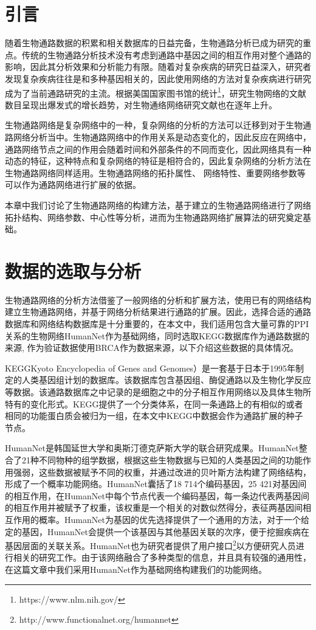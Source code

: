 \section{引言}
随着生物通路数据的积累和相关数据库的日益完备，生物通路分析已成为研究的重点。传统的生物通路分析技术没有考虑到通路中基因之间的相互作用对整个通路的影响，因此其分析效果和分析能力有限。随着对复杂疾病的研究日益深入，研究者发现复杂疾病往往是和多种基因相关的，因此使用网络的方法对复杂疾病进行研究成为了当前通路研究的主流。根据美国国家图书馆的统计\footnote{https://www.nlm.nih.gov/}，研究生物网络的文献数目呈现出爆发式的增长趋势，对生物通络网络研究文献也在逐年上升。

生物通路网络是复杂网络中的一种，复杂网络的分析的方法可以迁移到对于生物通路网络分析当中。生物通路网络中的作用关系是动态变化的，因此反应在网络中，通路网络节点之间的作用会随着时间和外部条件的不同而变化，因此网络具有一种动态的特征，这种特点和复杂网络的特征是相符合的，因此复杂网络的分析方法在生物通路网络同样适用。生物通路网络的拓扑属性、 网络特性、重要网络参数等可以作为通路网络进行扩展的依据。

本章中我们讨论了生物通路网络的构建方法，基于建立的生物通路网络进行了网络拓扑结构、网络参数、中心性等分析，进而为生物通路网络扩展算法的研究奠定基础。

\section{数据的选取与分析}
生物通路网络的分析方法借鉴了一般网络的分析和扩展方法，使用已有的网络结构建立生物通路网络，并基于网络分析结果进行通路的扩展。因此，选择合适的通路数据库和网络结构数据库是十分重要的，在本文中，我们适用包含大量可靠的PPI关系的生物网络HumanNet\cite{lee2011prioritizing}作为基础网络，同时选取KEGG\cite{kanehisa2008kegg}数据库作为通路数据的来源, 作为验证数据使用BRCA作为数据来源，以下介绍这些数据的具体情况。

KEGG\cite{kanehisa2008kegg}Kyoto Encyclopedia of Genes and Genomes）是一套基于日本于1995年制定的人类基因组计划的数据库。该数据库包含基因组、酶促通路以及生物化学反应等数据。该通路数据库之中记录的是细胞之中的分子相互作用网络以及具体生物所特有的变化形式。KEGG\cite{kanehisa2008kegg}提供了一个分类体系，在同一条通路上的有相似的或者相同的功能蛋白质会被归为一组，在本文中KEGG中数据会作为通路扩展的种子节点。

HumanNet\cite{lee2011prioritizing}是韩国延世大学和奥斯汀德克萨斯大学的联合研究成果。HumanNet\cite{lee2011prioritizing}整合了21种不同物种的组学数据，根据这些生物数据与已知的人类基因之间的功能作用强弱，这些数据被赋予不同的权重，并通过改进的贝叶斯方法构建了网络结构，形成了一个概率功能网络。HumanNet囊括了18 714个编码基因，25 421对基因间的相互作用，在HumanNet中每个节点代表一个编码基因，每一条边代表两基因间的相互作用并被赋予了权重，该权重是一个相关的对数似然得分，表征两基因间相互作用的概率。HumanNet为基因的优先选择提供了一个通用的方法，对于一个给定的基因，HumanNet会提供一个该基因与其他基因关联的次序，便于挖掘疾病在基因层面的关联关系。HumanNet也为研究者提供了用户接口\footnote{http://www.functionalnet.org/humannet}以方便研究人员进行相关的研究工作。由于该网络融合了多种类型的信息，并且具有较强的通用性，在这篇文章中我们采用HumanNet作为基础网络构建我们的功能网络。

